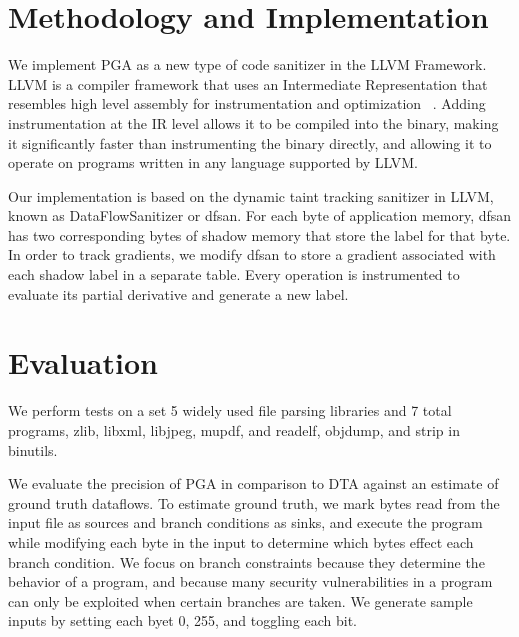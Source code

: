 \documentclass[conference]{IEEEtran}
\begin{document}
\section{Methodology and Implementation}

We implement PGA as a new type of code sanitizer in the LLVM Framework. LLVM is a compiler framework that uses an Intermediate Representation that resembles high level assembly for instrumentation and optimization ~\cite{llvm2004}. Adding instrumentation at the IR level allows it to be compiled into the binary, making it significantly faster than instrumenting the binary directly, and allowing it to operate on programs written in any language supported by LLVM.

Our implementation is based on the dynamic taint tracking sanitizer in LLVM, known as DataFlowSanitizer or dfsan. For each byte of application memory, dfsan has two corresponding bytes of shadow memory  that store the label for that byte. In order to track gradients, we modify dfsan to store a gradient associated with each shadow label in a separate table. Every operation is instrumented to evaluate its partial derivative and generate a new label.


\section{Evaluation}

We perform tests on a set 5 widely used file parsing libraries and 7 total programs, zlib, libxml, libjpeg, mupdf, and readelf, objdump, and strip in binutils.

We evaluate the precision of PGA in comparison to DTA against an estimate of ground truth dataflows. To estimate ground truth, we mark bytes read from the input file as sources and branch conditions as sinks, and execute the program while modifying each byte in the input to determine which bytes effect each branch condition. We focus on branch constraints because they determine the behavior of a program, and because many security vulnerabilities in a program can only be exploited when certain branches are taken. We generate sample inputs by setting each byet 0, 255, and toggling each bit. 
\end{document}
